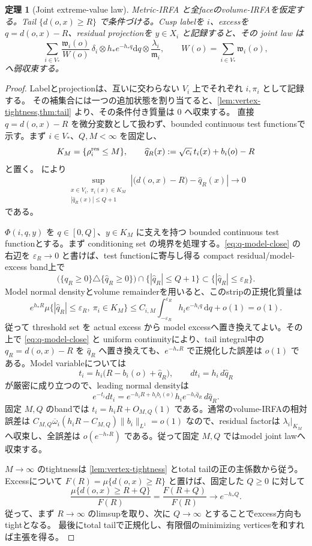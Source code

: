 \documentclass[11pt,a4paper]{ltjsarticle}
\newcommand{\dd}{\mathrm d}
\theoremstyle{plain}
\newtheorem{theorem}{定理}[section]
\theoremstyle{definition}
\theoremstyle{remark}
\begin{document}
\begin{theorem}[Joint extreme-value law]
\label{thm:joint}
Metric-IRFA と全faceのvolume-IRFAを仮定する。Tail $\{d(o,x)\ge R\}$ で条件づける。Cusp labelを $i$、excessを $q=d(o,x)-R$、residual projectionを $y\in X_i$ と記録すると、その joint law は
\[
 \boxed{
 \sum_{i\in V_*}
 \frac{\mathfrak w_i(o)}{W(o)}\,
 \delta_i\otimes h_*e^{-h_*q}\dd q\otimes
 \frac{\lambda_i}{\mathfrak m_i},
 \qquad W(o)=\sum_{i\in V_*}\mathfrak w_i(o),}
\]
へ弱収束する。
\end{theorem}
\begin{proof}
Labelとprojectionは、互いに交わらない $V_i$ 上でそれぞれ $i,\pi_i$ として記録する。
その補集合には一つの追加状態を割り当てると、\cref{lem:vertex-tightness,thm:tail} より、その条件付き質量は $0$ へ収束する。
直接 $q=d(o,x)-R$ を微分変数として扱わず、bounded continuous test functionsで示す。まず $i\in V_*$、$Q,M<\infty$ を固定し、
\[
 K_M=\{\rho_i^{\rm res}\le M\},
 \qquad
 \widehat q_R(x):=\sqrt{c_i}\,t_i(x)+b_i(o)-R
\]
と置く。 により
\begin{equation}
\label{eq:q-model-close}
 \sup_{\substack{x\in V_i,\ \pi_i(x)\in K_M\\|\widehat q_R(x)|\le Q+1}}
 \left|\bigl(d(o,x)-R\bigr)-\widehat q_R(x)\right|
 \longrightarrow0
\end{equation}
である。

$\Phi(i,q,y)$ を $q\in[0,Q]$、$y\in K_M$ に支えを持つ bounded continuous test functionとする。まず conditioning set の境界を処理する。\eqref{eq:q-model-close} の右辺を $\varepsilon_R\to0$ と書けば、test functionに寄与し得る compact residual/model-excess band上で
\[
 \bigl(\{q_R\ge0\}\triangle\{\widehat q_R\ge0\}\bigr)
 \cap\{|\widehat q_R|\le Q+1\}
 \subset\{|\widehat q_R|\le\varepsilon_R\}.
\]
Model normal densityとvolume remainderを用いると、このstripの正規化質量は
\[
 e^{h_*R}\mu\{|\widehat q_R|\le\varepsilon_R,\ \pi_i\in K_M\}
 \le C_{i,M}\int_{-\varepsilon_R}^{\varepsilon_R}h_i e^{-h_iq}\,\dd q+o(1)
 =o(1).
\]
従って threshold set を actual excess から model excessへ置き換えてよい。その上で \eqref{eq:q-model-close} と uniform continuityにより、tail integral中の $q_R=d(o,x)-R$ を $\widehat q_R$ へ置き換えても、$e^{-h_*R}$ で正規化した誤差は $o(1)$ である。Model variableについては
\[
 t_i=h_i\bigl(R-b_i(o)+\widehat q_R\bigr),
 \qquad
 dt_i=h_i\,d\widehat q_R
\]
が厳密に成り立つので、leading normal densityは
\[
 e^{-t_i}dt_i
 =e^{-h_iR+h_ib_i(o)}h_i e^{-h_i\widehat q_R}\,d\widehat q_R.
\]
固定 $M,Q$ のbandでは $t_i=h_iR+O_{M,Q}(1)$ である。通常のvolume-IRFAの相対誤差は $C_{M,Q}\overline\omega_i(h_iR-C_{M,Q})\|b_i\|_{L^1}=o(1)$ なので、residual factorは $\lambda_i|_{K_M}$ へ収束し、全誤差は $o(e^{-h_*R})$ である。従って固定 $M,Q$ ではmodel joint lawへ収束する。

$M\to\infty$ のtightnessは \cref{lem:vertex-tightness} とtotal tailの正の主係数から従う。
Excessについて $F(R)=\mu\{d(o,x)\ge R\}$ と置けば、固定した $Q\ge0$ に対して
\[
 \frac{\mu\{d(o,x)\ge R+Q\}}{F(R)}
 =\frac{F(R+Q)}{F(R)}
 \longrightarrow e^{-h_*Q}.
\]
従って、まず $R\to\infty$ のlimsupを取り、次に $Q\to\infty$ とすることでexcess方向もtightとなる。
最後にtotal tailで正規化し、有限個のminimizing verticesを和すれば主張を得る。
\end{proof}
\end{document}
